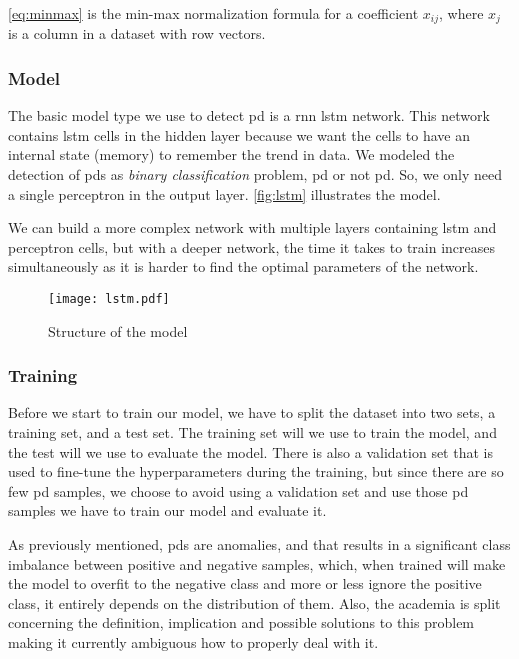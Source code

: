 

\autoref{eq:minmax} is the min-max normalization formula for a coefficient $x_{ij}$, where $x_j$ is a column in a dataset with row vectors.

\subsubsection{Model}
The basic model type we use to detect \ac{pd} is a \ac{rnn} \ac{lstm} network. This network contains \ac{lstm} cells in the hidden layer because we want the cells to have an internal state (memory) to remember the trend in data. We modeled the detection of \acp{pd} as \emph{binary classification} problem, \ac{pd} or not \ac{pd}. So, we only need a single perceptron in the output layer. \autoref{fig:lstm} illustrates the model.

We can build a more complex network with multiple layers containing \ac{lstm} and perceptron cells, but with a deeper network, the time it takes to train increases simultaneously as it is harder to find the optimal parameters of the network. 

\begin{figure}[ht]
    \centering
    \texttt{[image: lstm.pdf]}
    \caption[\project's deep learning model]{Structure of the model}
    \label{fig:lstm}
\end{figure}

\subsubsection{Training}
Before we start to train our model, we have to split the dataset into two sets, a training set, and a test set. The training set will we use to train the model, and the test will we use to evaluate the model. There is also a validation set that is used to fine-tune the hyperparameters during the training, but since there are so few \ac{pd} samples, we choose to avoid using a validation set and use those \ac{pd} samples we have to train our model and evaluate it.

As previously mentioned, \acp{pd} are anomalies, and that results in a significant class imbalance between positive and negative samples, which, when trained will make the model to overfit to the negative class and more or less ignore the positive class, it entirely depends on the distribution of them. Also, the academia is split concerning the definition, implication and possible solutions to this problem~\cite{tw_imbalance_2} making it currently ambiguous how to properly deal with it.

